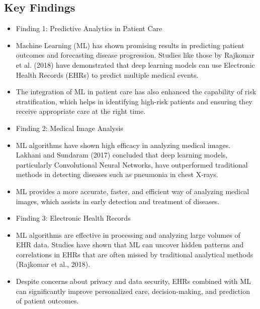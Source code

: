 \documentclass[conference]{IEEEtran}
\begin{document}
\subsection{Key Findings}
\begin{itemize}
\item Finding 1: Predictive Analytics in Patient Care
\end{itemize}
\begin{itemize}
\item Machine Learning (ML) has shown promising results in predicting patient outcomes and forecasting disease progression. Studies like those by Rajkomar et al. (2018) have demonstrated that deep learning models can use Electronic Health Records (EHRs) to predict multiple medical events.
\end{itemize}
\begin{itemize}
\item The integration of ML in patient care has also enhanced the capability of risk stratification, which helps in identifying high-risk patients and ensuring they receive appropriate care at the right time.
\end{itemize}
\begin{itemize}
\item Finding 2: Medical Image Analysis
\end{itemize}
\begin{itemize}
\item ML algorithms have shown high efficacy in analyzing medical images. Lakhani and Sundaram (2017) concluded that deep learning models, particularly Convolutional Neural Networks, have outperformed traditional methods in detecting diseases such as pneumonia in chest X-rays.
\end{itemize}
\begin{itemize}
\item ML provides a more accurate, faster, and efficient way of analyzing medical images, which assists in early detection and treatment of diseases.
\end{itemize}
\begin{itemize}
\item Finding 3: Electronic Health Records
\end{itemize}
\begin{itemize}
\item ML algorithms are effective in processing and analyzing large volumes of EHR data. Studies have shown that ML can uncover hidden patterns and correlations in EHRs that are often missed by traditional analytical methods (Rajkomar et al., 2018).
\end{itemize}
\begin{itemize}
\item Despite concerns about privacy and data security, EHRs combined with ML can significantly improve personalized care, decision-making, and prediction of patient outcomes.
\end{itemize}
\end{document}
